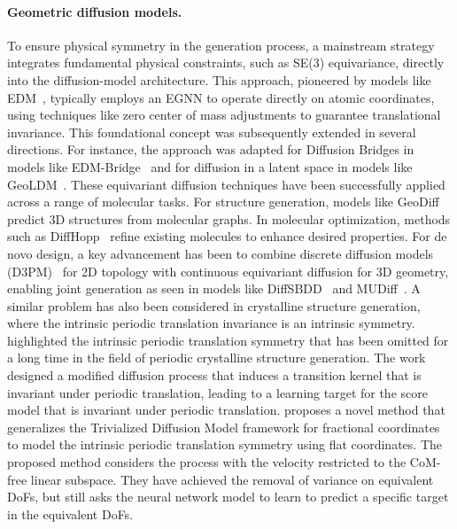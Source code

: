 \paragraph{Geometric diffusion models.} 
To ensure physical symmetry in the generation process, a mainstream strategy integrates fundamental physical constraints, such as SE(3) equivariance, directly into the diffusion-model architecture. This approach, pioneered by models like EDM~\citep{hoogeboom2022equivariant}, typically employs an EGNN to operate directly on atomic coordinates, using techniques like zero center of mass adjustments to guarantee translational invariance. This foundational concept was subsequently extended in several directions. For instance, the approach was adapted for Diffusion Bridges in models like EDM-Bridge~\citep{wu2022diffusion} and for diffusion in a latent space in models like GeoLDM~\citep{xu2023geometric}. These equivariant diffusion techniques have been successfully applied across a range of molecular tasks. For structure generation, models like GeoDiff~\citep{xu2022geodiff} predict 3D structures from molecular graphs. In molecular optimization, methods such as DiffHopp~\citep{torge2023diffhopp} refine existing molecules to enhance desired properties. For de novo design, a key advancement has been to combine discrete diffusion models (D3PM)~\citep{austin2021structured} for 2D topology with continuous equivariant diffusion for 3D geometry, enabling joint generation as seen in models like DiffSBDD~\citep{schneuing2024structure} and MUDiff~\citep{hua2024mudiff}. %
A similar problem has also been considered in crystalline structure generation, where the intrinsic periodic translation invariance is an intrinsic symmetry. \citet{lin2024equivariant} highlighted the intrinsic periodic translation symmetry that has been omitted for a long time in the field of periodic crystalline structure generation. The work designed a modified diffusion process that induces a transition kernel that is invariant under periodic translation, %
leading to a learning target for the score model that is invariant under periodic translation. \citet{cornet2025kinetic} proposes a novel method that generalizes the Trivialized Diffusion Model framework for fractional coordinates to model the intrinsic periodic translation symmetry using flat coordinates. The proposed method considers the process with the velocity restricted to the CoM-free linear subspace. %
They have achieved the removal of variance on equivalent DoFs, but still asks the neural network model to learn to predict a specific target in the equivalent DoFs.

